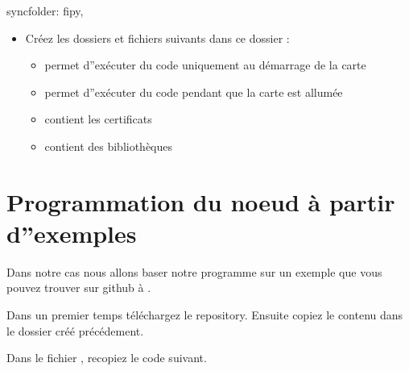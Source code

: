 \documentclass[letterpaper,10pt,french]{sphinxmanual}
\begin{document}
\begin{sphinxVerbatim}[commandchars=\\\{\}]
\PYGZdq{}sync\PYGZus{}folder\PYGZdq{}: \PYGZdq{}fipy\PYGZdq{},
\end{sphinxVerbatim}
\begin{itemize}
\item {} 
Créez les dossiers et fichiers suivants dans ce dossier :
\begin{itemize}
\item {} 
 permet d”exécuter du code uniquement au démarrage de la carte

\item {} 
 permet d”exécuter du code pendant que la carte est allumée

\item {} 
 contient les certificats

\item {} 
 contient des bibliothèques

\end{itemize}

\end{itemize}



\section{Programmation du noeud à partir d”exemples}
\label{\detokenize{AnnexeA:programmation-du-noeud-a-partir-d-exemples}}
Dans notre cas nous allons baser notre programme sur un exemple que vous pouvez trouver sur github à .

Dans un premier temps téléchargez le repository. Ensuite copiez le contenu  dans le dossier  créé précédement.


Dans le fichier , recopiez le code suivant.
\end{document}
